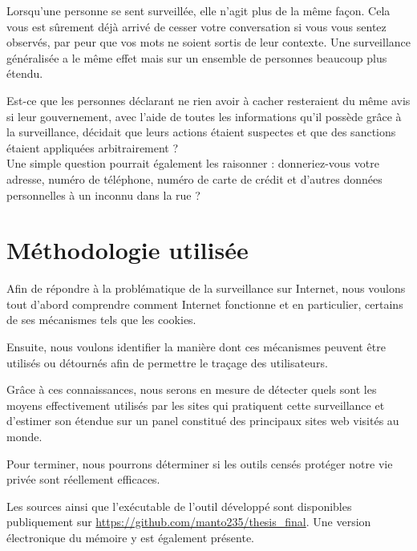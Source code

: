 Lorsqu'une personne se sent surveillée, elle n'agit plus de la même façon. Cela vous est sûrement déjà arrivé de cesser votre conversation si vous vous sentez observés, par peur que vos mots ne soient sortis de leur contexte. Une surveillance généralisée a le même effet mais sur un ensemble de personnes beaucoup plus étendu.
\newline

Est-ce que les personnes déclarant ne rien avoir à cacher resteraient du même avis si leur gouvernement, avec l'aide de toutes les informations qu'il possède grâce à la surveillance, décidait que leurs actions étaient suspectes et que des sanctions étaient appliquées arbitrairement ?\\
Une simple question pourrait également les raisonner : donneriez-vous votre adresse, numéro de téléphone, numéro de carte de crédit et d'autres données personnelles à un inconnu dans la rue ?

\section{Méthodologie utilisée}
Afin de répondre à la problématique de la surveillance sur Internet, nous voulons tout d'abord comprendre comment Internet fonctionne et en particulier, certains de ses mécanismes tels que les cookies.

Ensuite, nous voulons identifier la manière dont ces mécanismes peuvent être utilisés ou détournés afin de permettre le traçage des utilisateurs.

Grâce à ces connaissances, nous serons en mesure de détecter quels sont les moyens effectivement utilisés par les sites qui pratiquent cette surveillance et d'estimer son étendue sur un panel constitué des principaux sites web visités au monde.

Pour terminer, nous pourrons déterminer si les outils censés protéger notre vie privée sont réellement efficaces. %
\newline

Les sources ainsi que l'exécutable de l'outil développé sont disponibles publiquement sur \url{https://github.com/manto235/thesis_final}. Une version électronique du mémoire y est également présente.
